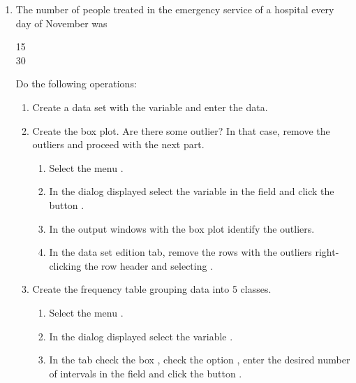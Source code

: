 \begin{enumerate}[leftmargin=*]
\item The number of people treated in the emergency service of a hospital every day of November was
\begin{center}
15               \\
30              
\end{center}
Do the following operations: 
\begin{enumerate}
\item Create a data set with the variable  and enter the data.

\item Create the box plot. Are there some outlier? In that case, remove the outliers and proceed with the next part.
\begin{indication}
\begin{enumerate}
\item Select the menu .
\item In the dialog displayed select the variable  in the field  and
click the button .
\item In the output windows with the box plot identify the outliers.
\item In the data set edition tab, remove the rows with the outliers right-clicking the row header and selecting
.
\end{enumerate}
\end{indication}

\item Create the frequency table grouping data into 5 classes.
\begin{indication}
\begin{enumerate}
\item Select the menu .
\item In the dialog displayed select the variable .
\item In the  tab check the box , check the option , enter the desired number of intervals in the field  and
click the button .
\end{enumerate}
\end{indication}


\end{enumerate}
\end{enumerate}
